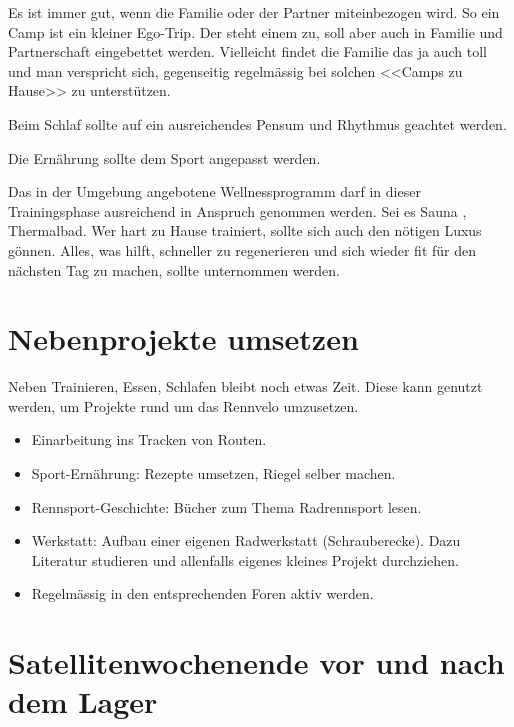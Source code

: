 \documentclass[a4paper,DIV13,BCOR0cm]{scrartcl}
\newcommand{\rv}{Rennvelo}
\begin{document}
Es ist immer gut, wenn die Familie oder der Partner miteinbezogen wird.
So ein Camp ist ein kleiner Ego-Trip. Der steht einem zu, soll aber auch in Familie und Partnerschaft eingebettet werden.
Vielleicht findet die Familie das ja auch toll und man verspricht sich, gegenseitig regelmässig bei solchen <<Camps zu Hause>> zu unterstützen.

Beim Schlaf sollte auf ein ausreichendes Pensum und Rhythmus geachtet werden.

Die Ernährung sollte dem Sport angepasst werden.

Das in der Umgebung angebotene Wellnessprogramm darf in dieser Trainingsphase ausreichend in Anspruch genommen werden.
Sei es Sauna \cite[S. 795]{Weineck2010}, Thermalbad.
Wer hart zu Hause trainiert, sollte sich auch den nötigen Luxus gönnen.
Alles, was hilft, schneller zu regenerieren und sich wieder fit für den nächsten Tag zu machen, sollte unternommen werden.

% 
% 

\section{Nebenprojekte umsetzen}

Neben Trainieren, Essen, Schlafen bleibt noch etwas Zeit.
Diese kann genutzt werden, um Projekte rund um das \rv{} umzusetzen.

\begin{itemize}
        \item Einarbeitung ins Tracken von Routen.
        \item Sport-Ernährung: Rezepte umsetzen, Riegel selber machen.
        \item Rennsport-Geschichte: Bücher zum Thema Radrennsport lesen.
        \item Werkstatt: Aufbau einer eigenen Radwerkstatt (Schrauberecke).
                Dazu Literatur studieren und allenfalls eigenes kleines Projekt durchziehen.
        \item Regelmässig in den entsprechenden Foren aktiv werden.
\end{itemize}


\section{Satellitenwochenende vor und nach dem Lager}
\end{document}
